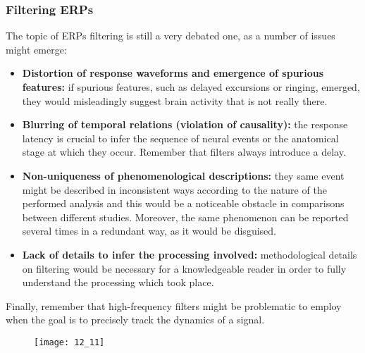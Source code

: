 \subsubsection{Filtering ERPs}
The topic of ERPs filtering is still a very debated one, as a number of issues might emerge:
\begin{itemize}
    \item \textbf{Distortion of response waveforms and emergence of spurious features:} if spurious
          features, such as delayed excursions or ringing, emerged, they would misleadingly
          suggest brain activity that is not really there.
    \item \textbf{Blurring of temporal relations (violation of causality):} the response latency is
          crucial to infer the sequence of neural events or the anatomical stage at which they
          occur. Remember that filters always introduce a delay.
    \item \textbf{Non-uniqueness of phenomenological descriptions:} they same event might be
          described in inconsistent ways according to the nature of the performed analysis and
          this would be a noticeable obstacle in comparisons between different studies. Moreover,
          the same phenomenon can be reported several times in a redundant way, as it would be
          disguised.
    \item \textbf{Lack of details to infer the processing involved:} methodological details
          on filtering would be necessary for a knowledgeable reader in order to fully understand
          the processing which took place.
\end{itemize}
Finally, remember that high-frequency filters might be problematic to employ when the goal is
to precisely track the dynamics of a signal.
\begin{figure}[H]
    \centering
    \texttt{[image: 12\_11]}
\end{figure}